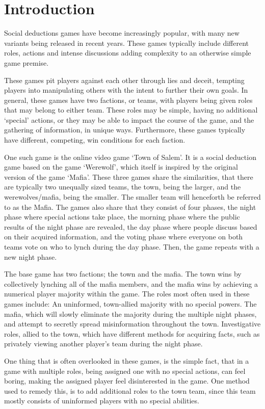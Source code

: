 \section{Introduction}
Social deductions games have become increasingly popular, with many new
variants being released in recent years. These games typically include
different roles, actions and intense discussions adding complexity to an
otherwise simple game premise.

These games pit players against each other through lies and deceit, tempting
players into manipulating others with the intent to further their own goals. In
general, these games have two factions, or teams, with players being given
roles that may belong to either team. These roles may be simple, having no
additional ‘special’ actions, or they may be able to impact the course of the
game, and the gathering of information, in unique ways. Furthermore, these
games typically have different, competing, win conditions for each faction.

One such game is the online video game ‘Town of Salem’. It is a social
deduction game based on the game ‘Werewolf’, which itself is inspired by the
original version of the game ‘Mafia’. These three games share the similarities,
that there are typically two unequally sized teams, the town, being the larger,
and the werewolves/mafia, being the smaller. The smaller team will henceforth
be referred to as the Mafia. The games also share that they consist of four
phases, the night phase where special actions take place, the morning phase
where the public results of the night phase are revealed, the day phase where
people discuss based on their acquired information, and the voting phase where
everyone on both teams vote on who to lynch during the day phase. Then, the
game repeats with a new night phase.

The base game has two factions; the town and the mafia. The town wins by
collectively lynching all of the mafia members, and the mafia wins by achieving
a numerical player majority within the game. The roles most often used in these
games include: An uninformed, town-allied majority with no special powers. The
mafia, which will slowly eliminate the majority during the multiple night
phases, and attempt to secretly spread misinformation throughout the town.
Investigative roles, allied to the town, which have different methods for
acquiring facts, such as privately viewing another player’s team during the
night phase.

One thing that is often overlooked in these games, is the simple fact, that in
a game with multiple roles, being assigned one with no special actions, can
feel boring, making the assigned player feel disinterested in the game. One
method used to remedy this, is to add additional roles to the town team, since
this team mostly consists of uninformed players with no special abilities.

